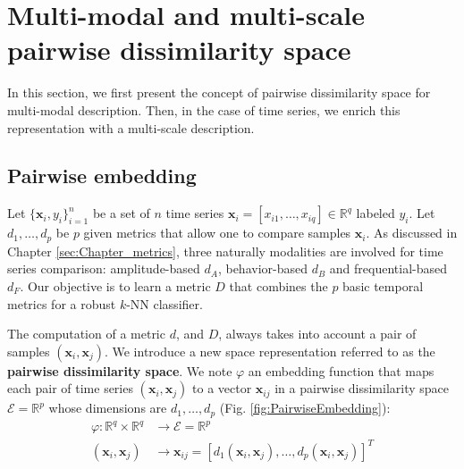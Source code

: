 \section{Multi-modal and multi-scale pairwise dissimilarity space}
\label{sec:Pairwise_embedding}
In this section, we first present the concept of pairwise dissimilarity space for multi-modal description. Then, in the case of time series, we enrich this representation with a multi-scale description. 

\subsection{Pairwise embedding}
Let $\{\textbf{x}_{i}, y_{i}\}_{i=1}^n$ be a set of $n$ time series $\textbf{x}_i = [x_{i1}, \ldots, x_{iq}] \in \mathbb{R}^q$ labeled $y_{i}$. Let  $d_1, \ldots , d_p$ be $p$ given metrics that allow one to compare samples $\textbf{x}_{i}$. As discussed in Chapter \ref{sec:Chapter_metrics}, three naturally modalities are involved for time series comparison: amplitude-based $d_A$, behavior-based $d_B$ and frequential-based $d_F$. Our objective is to learn a metric $D$ that combines the $p$ basic temporal metrics for a robust $k$-NN classifier.

The computation of a metric $d$, and $D$, always takes into account a pair of samples $(\textbf{x}_i,\textbf{x}_j)$. We introduce a new space representation referred to as the \textbf{pairwise dissimilarity space}. We note $\varphi$ an embedding function that maps each pair of time
series $(\textbf{x}_i, \textbf{x}_j)$ to a vector $\textbf{x}_{ij}$ in a pairwise dissimilarity space $\mathcal{E} = \mathbb{R}^p$ whose dimensions are $d_1, \ldots, d_p$ (Fig. \ref{fig:PairwiseEmbedding}):
\begin{equation}
\begin{aligned}
\varphi : \mathbb{R}^q \times \mathbb{R}^q & \rightarrow \mathcal{E} = \mathbb{R}^p \\
(\textbf{x}_i, \textbf{x}_j) & \rightarrow \textbf{x}_{ij} = [d_1(\textbf{x}_i, \textbf{x}_j), \ldots, d_p(\textbf{x}_i, \textbf{x}_j)]^T
\end{aligned}
\label{eq:projection}
\end{equation}


